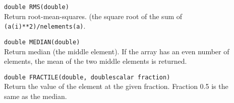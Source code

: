 \begin{description}
  \item[] \texttt{double RMS(double)}\\
    Return root-mean-squares. (the square root of the sum of
    \\\texttt{(a(i)**2)/nelements(a)}.
  \item[] \texttt{double MEDIAN(double)}\\
    Return median (the middle element).
    If the array has an even number of elements, the mean of
    the two middle elements is returned.
  \item[] \texttt{double FRACTILE(double, doublescalar fraction)}\\
    Return the value of the element at the given fraction.
    Fraction 0.5 is the same as the median.
\end{description}

